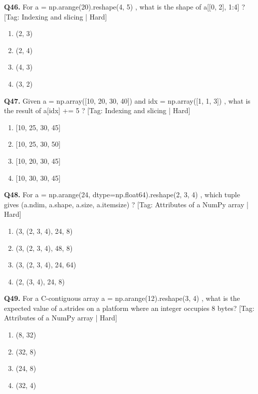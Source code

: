 \vspace{2mm}
\noindent\textbf{Q46.} For a = np.arange(20).reshape(4, 5) , what is the shape of a[[0, 2], 1:4] ? \hfill [Tag: Indexing and slicing | Hard]
\begin{enumerate}[label=(\alph*),topsep=2pt,itemsep=1pt,partopsep=0pt,parsep=0pt]
    \item {(2, 3)}
    \item {(2, 4)}
    \item {(4, 3)}
    \item {(3, 2)}
\end{enumerate}
\vspace{2mm}
\noindent\textbf{Q47.} Given a = np.array([10, 20, 30, 40]) and idx = np.array([1, 1, 3]) , what is the result of a[idx] += 5 ? \hfill [Tag: Indexing and slicing | Hard]
\begin{enumerate}[label=(\alph*),topsep=2pt,itemsep=1pt,partopsep=0pt,parsep=0pt]
    \item {[10, 25, 30, 45]}
    \item {[10, 25, 30, 50]}
    \item {[10, 20, 30, 45]}
    \item {[10, 30, 30, 45]}
\end{enumerate}
\vspace{2mm}
\noindent\textbf{Q48.} For a = np.arange(24, dtype=np.float64).reshape(2, 3, 4) , which tuple gives (a.ndim, a.shape, a.size, a.itemsize) ? \hfill [Tag: Attributes of a NumPy array | Hard]
\begin{enumerate}[label=(\alph*),topsep=2pt,itemsep=1pt,partopsep=0pt,parsep=0pt]
    \item {(3, (2, 3, 4), 24, 8)}
    \item {(3, (2, 3, 4), 48, 8)}
    \item {(3, (2, 3, 4), 24, 64)}
    \item {(2, (3, 4), 24, 8)}
\end{enumerate}
\vspace{2mm}
\noindent\textbf{Q49.} For a C-contiguous array a = np.arange(12).reshape(3, 4) , what is the expected value of a.strides on a platform where an integer occupies 8 bytes? \hfill [Tag: Attributes of a NumPy array | Hard]
\begin{enumerate}[label=(\alph*),topsep=2pt,itemsep=1pt,partopsep=0pt,parsep=0pt]
    \item {(8, 32)}
    \item {(32, 8)}
    \item {(24, 8)}
    \item {(32, 4)}
\end{enumerate}
